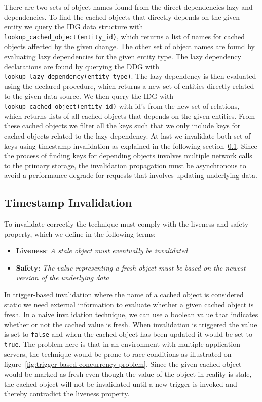There are two sets of object names found from the direct dependencies lazy and dependencies. To find the cached objects that directly depends on the given entity we query the IDG data structure with \verb$lookup_cached_object(entity_id)$, which returns a list of names for cached objects affected by the given change. The other set of object names are found by evaluating lazy dependencies for the given entity type.
The lazy dependency declarations are found by querying the DDG with \verb$lookup_lazy_dependency(entity_type)$. The lazy dependency is then evaluated using the declared procedure, which returns a new set of entities directly related to the given data source. We then query the IDG with \verb$lookup_cached_object(entity_id)$ with id's from the new set of relations, which returns lists of all cached objects that depends on the given entities. From these cached objects we filter all the keys such that we only include keys for cached objects related to the lazy dependency.
At last we invalidate both set of keys using timestamp invalidation as explained in the following section~\ref{subsec:timestamp-invalidation}.
Since the process of finding keys for depending objects involves multiple network calls to the primary storage, the invalidation propagation must be asynchronous to avoid a performance degrade for requests that involves updating underlying data.


\subsection{Timestamp Invalidation}
\label{subsec:timestamp-invalidation}

To invalidate correctly the technique must comply with the liveness and safety property, which we define in the following terms:

\begin{itemize}
  \item \textbf{Liveness}: \emph{A stale object must eventually be invalidated}
  \item \textbf{Safety}: \emph{The value representing a fresh object must be based on the newest version of the underlying data}
\end{itemize}

In trigger-based invalidation where the name of a cached object is considered static we need external information to evaluate whether a given cached object is fresh. In a naive invalidation technique, we can use a boolean value that indicates whether or not the cached value is fresh. When invalidation is triggered the value is set to \verb$false$ and when the cached object has been updated it would be set to \verb$true$. The problem here is that in an environment with multiple application servers, the technique would be prone to race conditions as illustrated on figure~\ref{fig:trigger-based-concurrency-problem}. Since the given cached object would be marked as fresh even though the value of the object in reality is stale, the cached object will not be invalidated until a new trigger is invoked and thereby contradict the liveness property.

